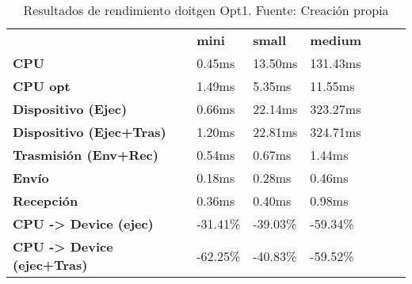 \begin{table}[H]
    \centering
    \begin{tabular}{lllllll}
    \rowcolor[HTML]{DAE8FC} \ &  \textbf{mini} &  \textbf{	small} &  \textbf{	medium} \\
    \cellcolor[HTML]{DAE8FC} \textbf{CPU} & 0.45ms & 	13.50ms & 	131.43ms \\
    \rowcolor[HTML]{EFEFEF} \cellcolor[HTML]{DAE8FC} \textbf{CPU opt} & 1.49ms & 	5.35ms & 	11.55ms \\
    \cellcolor[HTML]{DAE8FC} \textbf{Dispositivo (Ejec)} & 0.66ms & 	22.14ms & 	323.27ms \\
    \rowcolor[HTML]{EFEFEF} \cellcolor[HTML]{DAE8FC} \textbf{Dispositivo (Ejec+Tras)} & 1.20ms & 	22.81ms & 	324.71ms \\
    \cellcolor[HTML]{DAE8FC} \textbf{Trasmisión (Env+Rec)} & 0.54ms & 	0.67ms & 	1.44ms \\
    \rowcolor[HTML]{EFEFEF} \cellcolor[HTML]{DAE8FC} \textbf{Envío} & 0.18ms & 	0.28ms & 	0.46ms \\
    \cellcolor[HTML]{DAE8FC} \textbf{Recepción} & 0.36ms & 	0.40ms & 	0.98ms \\
    \rowcolor[HTML]{EFEFEF} \cellcolor[HTML]{DAE8FC} \textbf{CPU -> Device (ejec)} & -31.41\% & 	-39.03\% & 	-59.34\% \\
    \cellcolor[HTML]{DAE8FC} \textbf{CPU -> Device (ejec+Tras)} & -62.25\% & 	-40.83\% & 	-59.52\% \\
    \end{tabular}
    \caption[Resultados de rendimiento doitgen Opt1]{{Resultados de rendimiento doitgen Opt1. Fuente: Creación propia}}
    \label{table_test_doitgen_Opt1_hw_performanceResults}
\end{table}